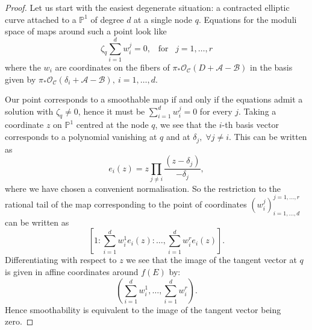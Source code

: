 \documentclass[11pt]{amsart}
\newcommand{\PP}{\mathbb P}
\renewcommand{\to}{\rightarrow}
\newcommand{\A}{\mathcal A}
\newcommand{\B}{\mathcal B}
\newcommand{\cC}{\mathcal C}
\theoremstyle{plain}
\newtheorem{prop}[thm]{Proposition}
\theoremstyle{definition}
\begin{document}

\begin{proof}
 Let us start with the easiest degenerate situation: a contracted elliptic curve attached to a $\PP^1$ of degree $d$ at a single node $q$. Equations for the moduli space of maps around such a point look like 
 \[\zeta_q\sum_{i=1}^d w_i^j=0,\;\;\;\text{for} \;\;\;j=1,\ldots,r\]
 where the $w_i$ are coordinates on the fibers of $\pi_*\mathcal O_{\cC}(D+\A-\B)$ in the basis given by $\pi_*\mathcal O_{\cC}(\delta_i+\A-\B),\ i=1,\ldots,d$.
 
  Our point corresponds to a smoothable map if and only if the equations admit a solution with $\zeta_q\neq 0$, hence it must be $\sum_{i=1}^d w_i^j=0$ for every $j$. Taking a coordinate $z$ on  $\PP^1$ centred at the node $q$, we see that the $i$-th basis vector corresponds to a polynomial vanishing at $q$ and at $\delta_j,\;\forall j\neq i$. This can be written as 
  \[e_i(z)=z\prod_{j\neq i}\frac{(z-\delta_j)}{-\delta_j},\] 
  where we have chosen a convenient normalisation. So the restriction to the rational tail of the map corresponding to the point of coordinates $(w_i^j)_{i=1,\ldots,d}^{j=1,\ldots,r}$ can be written as 
  \[[1:\sum_{i=1}^d w_i^1e_i(z):\ldots,\sum_{i=1}^d w_i^re_i(z)].\] 
  Differentiating with respect to $z$ we see that the image of the tangent vector at $q$ is given in affine coordinates around $f(E)$ by:
  \[(\sum_{i=1}^d w_i^1,\ldots,\sum_{i=1}^d w_i^r).\] 
  Hence smoothability is equivalent to the image of the tangent vector being zero.
 

\end{proof}
\end{document}
